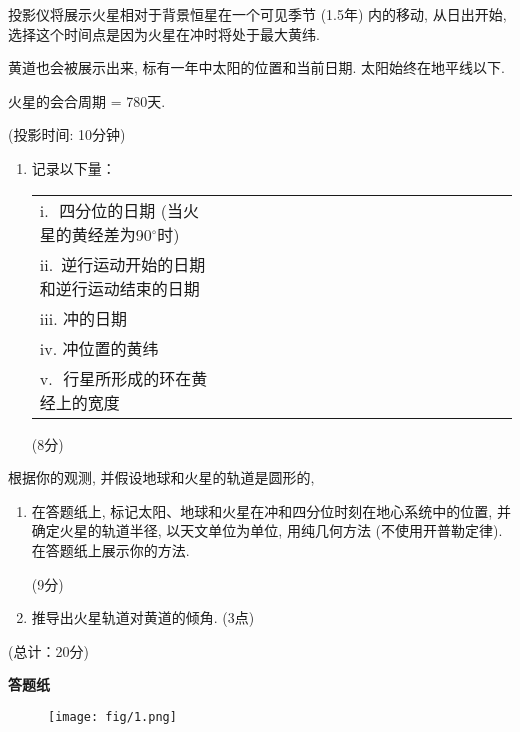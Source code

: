 \documentclass[a4paper,fontset=fandol]{ctexart}
\newcommand{\points}[1]{\par %
	\noindent %
	\hfill (#1分)%
	\vspace{1em}
	}
\begin{document}
	投影仪将展示火星相对于背景恒星在一个可见季节 (1.5年) 内的移动, 从日出开始, 选择这个时间点是因为火星在冲时将处于最大黄纬. 
	
	黄道也会被展示出来, 标有一年中太阳的位置和当前日期. 太阳始终在地平线以下. 
	
	火星的会合周期 = 780天. 
	
	{\hfill (投影时间: 10分钟)}
	
	\begin{enumerate}[label=(\alph*)]
		\item 记录以下量：
		\begin{table}[!h]
			\centering
			\begin{tabular}{|l|c|}
				\hline
				\multirow{2}{*}{i.\,\,\,\,四分位的日期 (当火星的黄经差为90$^\circ$时) }&~~~~~~~~~~~~~~~~~~~~~~~~~~~~~~~~~~~\\
				\cline{2-2}
				&\\
				\hline
				\multirow{2}{*}{ii.\,\,\,\parbox[t]{30em}{逆行运动开始的日期和逆行运动结束的日期}}&\\
				\cline{2-2}
				&\\
				\hline
				iii.\,\,冲的日期&\\
				\hline
				iv.\,\,冲位置的黄纬&\\
				\hline
				v.\,\,\,\,行星所形成的环在黄经上的宽度&\\
				\hline
			\end{tabular}
		\end{table}
		\points{8}
	\end{enumerate}
	
	根据你的观测, 并假设地球和火星的轨道是圆形的, 
	
	\begin{enumerate}[label=(\alph*),start=2]
		\item 在答题纸上, 标记太阳、地球和火星在冲和四分位时刻在地心系统中的位置, 并确定火星的轨道半径, 以天文单位为单位, 用纯几何方法 (不使用开普勒定律). 在答题纸上展示你的方法. 
		\points{9}
		
		\vspace{0em}
		\item 推导出火星轨道对黄道的倾角. \hfill(3点)
	\end{enumerate}
	\points{总计：20}
	
	\newpage
	
	{\Large\bfseries 答题纸}
	
	\begin{figure}[!h]
		\centering
		\texttt{[image: fig/1.png]}
	\end{figure}
	
\end{document}
